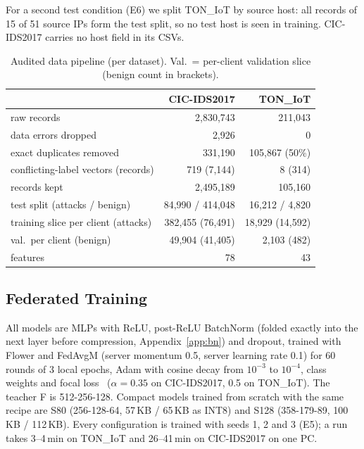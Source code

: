 \documentclass[sigplan,10pt,review,anonymous,nonacm]{acmart}
\newcommand{\cic}{CIC-IDS2017\xspace}
\newcommand{\ton}{TON\_IoT\xspace}
\begin{document}
For a second test condition (E6) we split \ton by source host: all records of 15 of 51 source IPs form
the test split, so no test host is seen in training. \cic carries no host field in its CSVs.

\begin{table}[t]
\caption{Audited data pipeline (per dataset). Val.\ = per-client validation slice (benign count in brackets).}
\label{tab:data}
\small\setlength{\tabcolsep}{3pt}
\begin{tabular}{lrr}
\toprule
 & \cic & \ton \\
\midrule
raw records & 2,830,743 & 211,043 \\
data errors dropped & 2,926 & 0 \\
exact duplicates removed & 331,190 & 105,867 (50\%) \\
conflicting-label vectors (records) & 719 (7,144) & 8 (314) \\
records kept & 2,495,189 & 105,160 \\
test split (attacks / benign) & 84,990 / 414,048 & 16,212 / 4,820 \\
training slice per client (attacks) & 382,455 (76,491) & 18,929 (14,592) \\
val.\ per client (benign) & 49,904 (41,405) & 2,103 (482) \\
features & 78 & 43 \\
\bottomrule
\end{tabular}
\end{table}

\subsection{Federated Training}\label{sec:fltrain}
All models are MLPs with ReLU, post-ReLU BatchNorm (folded exactly into the next layer before
compression, Appendix~\ref{app:bn}) and dropout, trained with Flower and FedAvgM (server momentum 0.5,
server learning rate 0.1) for 60 rounds of 3 local epochs, Adam with cosine decay from $10^{-3}$ to
$10^{-4}$, class weights and focal loss~\cite{lin2017focal} ($\alpha=0.35$ on \cic, 0.5 on \ton). The
teacher F is 512-256-128. Compact models trained from scratch with the same recipe are S80
(256-128-64, 57\,KB / 65\,KB as INT8) and S128 (358-179-89, 100\,KB / 112\,KB). Every configuration is
trained with seeds 1, 2 and 3 (E5); a run takes 3--4\,min on \ton and 26--41\,min on \cic on one PC.
\end{document}
